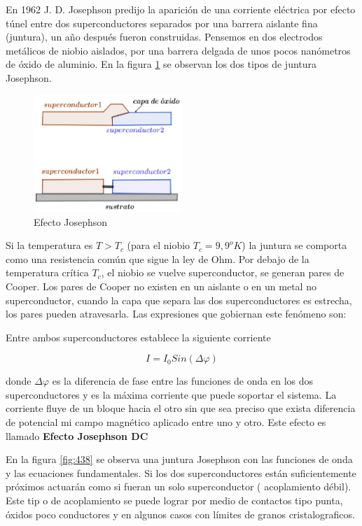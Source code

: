 En 1962 J. D. Josephson predijo la aparición de una corriente eléctrica por efecto túnel entre dos superconductores separados por una barrera aislante fina (juntura), un año después fueron construidas. Pensemos en dos electrodos metálicos de niobio aislados, por una barrera delgada de unos pocos nanómetros de óxido de aluminio. En la figura \ref{fig:437} se observan los dos tipos de juntura Josephson.

\begin{figure}[H]
    \centering
    \includegraphics[width=0.5\textwidth]{./Figures/fig437}
	\caption{Efecto Josephson}
	\label{fig:437}
\end{figure}

Si la temperatura es $T>T_{c}$ (para el niobio $T_{c}=9,9^{o}K$) la juntura se comporta como una resistencia común que sigue la ley de Ohm. Por debajo de la temperatura crítica $T_{c}$, el niobio se vuelve superconductor, se generan pares de Cooper. Los pares de Cooper no existen en un aislante o en un metal no superconductor, cuando la capa que separa las dos superconductores es estrecha, los pares pueden atravesarla. Las expresiones que gobiernan este fenómeno son:

Entre ambos superconductores establece la siguiente corriente 

\begin{equation}
	I=I_{0}Sin(\Delta\varphi)
\end{equation}

donde $\Delta\varphi$ es la diferencia de fase entre las funciones de onda en los dos superconductores y es la máxima corriente que puede soportar el sistema. La corriente fluye de un bloque hacia el otro sin que sea preciso que exista diferencia de potencial mi campo magnético aplicado entre uno y otro. Este efecto es llamado \textbf{Efecto Josephson DC}

En la figura \ref{fig:438} se observa una juntura Josephson con las funciones de onda y las ecuaciones fundamentales. Si los dos superconductores están suficientemente próximos actuarán como si fueran un solo superconductor ( acoplamiento débil). Este tip o de acoplamiento se puede lograr por medio de contactos tipo punta, óxidos poco conductores y en algunos casos con límites de granos cristalograficos.

